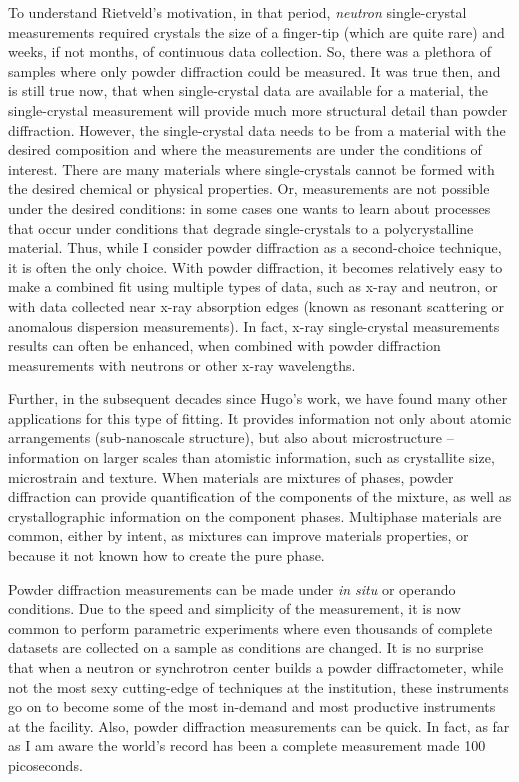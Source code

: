 To understand Rietveld's motivation, in that period, \textit{neutron} single-crystal measurements required crystals the size of a finger-tip (which are quite rare) and weeks, if not months, of continuous data collection. So, there was a plethora of samples where only powder diffraction could be measured. It was true then, and is still true now, that when single-crystal data are available for a material, the single-crystal measurement will provide much more structural detail than powder diffraction. However, the single-crystal data needs to be from a material with the desired composition and where the measurements are under the conditions of interest. There are many materials where single-crystals cannot be formed with the desired chemical or physical properties. Or, measurements are not possible under the desired conditions: in some cases one wants to learn about processes that occur under conditions that degrade single-crystals to a polycrystalline material. Thus, while I consider powder diffraction as a second-choice technique, it is often the only choice. With powder diffraction, it becomes relatively easy to make a combined fit using multiple types of data, such as x-ray and neutron, or with data collected near x-ray absorption edges (known as resonant scattering or anomalous dispersion measurements). In fact, x-ray single-crystal measurements results can often be enhanced, when combined with powder diffraction measurements with neutrons or other x-ray wavelengths.

Further, in the subsequent decades since Hugo's work, we have found many other applications for this type of fitting. It provides information not only about atomic arrangements (sub-nanoscale structure), but also about microstructure -- information on larger scales than atomistic information, such as crystallite size, microstrain and texture. When materials are mixtures of phases, powder diffraction can provide quantification of the components of the mixture, as well as crystallographic information on the component phases. Multiphase materials are common, either by intent, as mixtures can improve materials properties, or because it not known how to create the pure phase. 

Powder diffraction measurements can be made under \textit{in situ} or operando conditions. Due to the speed and simplicity of the measurement, it is now common to perform parametric experiments where even thousands of complete datasets are collected on a sample as conditions are changed. It is no surprise that when a neutron or synchrotron center builds a powder diffractometer, while not the most sexy cutting-edge of techniques at the institution, these instruments go on to become some of the most in-demand and most productive instruments at the facility. Also, powder diffraction measurements can be quick. In fact, as far as I am aware the world's record has been a complete measurement made 100 picoseconds.  

